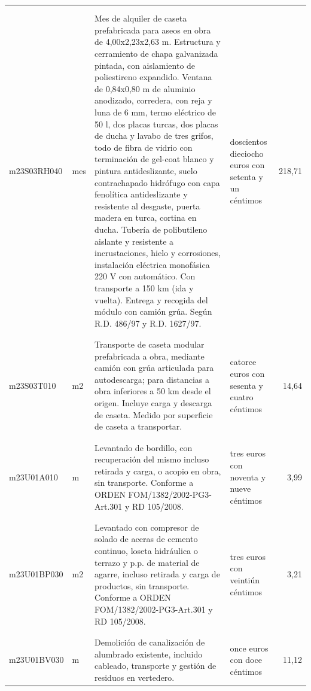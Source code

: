 \documentclass{book}%
\begin{document}
\begin{supertabular}{|l|l|p{5cm}|p{3cm}|r|}
&&&&\\%
&&&&\\%
m23S03RH040&mes&Mes de alquiler de caseta prefabricada para aseos en obra de 4,00x2,23x2,63 m. Estructura y cerramiento de chapa galvanizada pintada, con aislamiento de poliestireno expandido. Ventana de 0,84x0,80 m de aluminio anodizado, corredera, con reja y luna de 6 mm, termo eléctrico de 50 l, dos placas turcas, dos placas de ducha y lavabo de tres grifos, todo de fibra de vidrio con terminación de gel{-}coat blanco y pintura antideslizante, suelo contrachapado hidrófugo con capa fenolítica antideslizante y resistente al desgaste, puerta madera en turca, cortina en ducha. Tubería de polibutileno aislante y resistente a incrustaciones, hielo y corrosiones, instalación eléctrica monofásica 220 V con automático. Con transporte a 150 km (ida y vuelta). Entrega y recogida del módulo con camión grúa. Según R.D. 486/97 y R.D. 1627/97.&doscientos dieciocho euros con setenta y un céntimos&218,71\\%
&&&&\\%
&&&&\\%
m23S03T010&m2&Transporte de caseta modular prefabricada a obra, mediante camión con grúa articulada para autodescarga; para distancias a obra inferiores a 50 km desde el origen. Incluye carga y descarga de caseta. Medido por superficie de caseta a transportar.&catorce euros con sesenta y cuatro céntimos&14,64\\%
&&&&\\%
&&&&\\%
m23U01A010&m&Levantado de bordillo, con recuperación del mismo incluso retirada y carga, o acopio en obra, sin transporte. Conforme a ORDEN FOM/1382/2002{-}PG3{-}Art.301 y RD 105/2008.&tres euros con noventa y nueve céntimos&3,99\\%
&&&&\\%
&&&&\\%
m23U01BP030&m2&Levantado con compresor de solado de aceras de cemento continuo, loseta hidráulica o terrazo y p.p. de material de agarre, incluso retirada y carga de productos, sin transporte. Conforme a ORDEN FOM/1382/2002{-}PG3{-}Art.301 y RD 105/2008.&tres euros con veintiún céntimos&3,21\\%
&&&&\\%
&&&&\\%
m23U01BV030&m&Demolición de canalización de alumbrado existente, incluido cableado, transporte y gestión de residuos en vertedero.&once euros con doce céntimos&11,12\\%

\end{supertabular}
\end{document}
